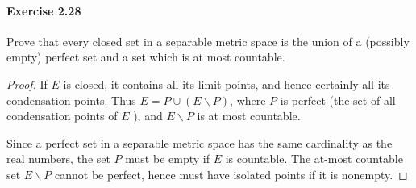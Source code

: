 \documentclass{article}
\theoremstyle{definition}
\begin{document}
\paragraph{Exercise 2.28} Prove that every closed set in a separable metric space is the union of a (possibly empty) perfect set and a set which is at most countable.
\begin{proof}
    If $E$ is closed, it contains all its limit points, and hence certainly all its condensation points. Thus $E=P \cup(E \backslash P)$, where $P$ is perfect (the set of all condensation points of $E$ ), and $E \backslash P$ is at most countable.

Since a perfect set in a separable metric space has the same cardinality as the real numbers, the set $P$ must be empty if $E$ is countable. The at-most countable set $E \backslash P$ cannot be perfect, hence must have isolated points if it is nonempty.
\end{proof}
\end{document}
